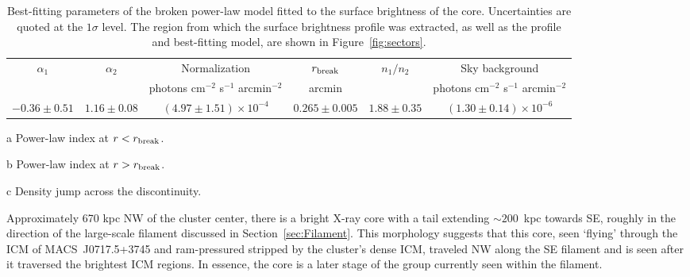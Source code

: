 \begin{table}
  \caption{Best-fitting parameters of the broken power-law model fitted to the surface brightness of the core. Uncertainties are quoted at the $1\sigma$ level. The region from which the surface brightness profile was extracted, as well as the profile and best-fitting model, are shown in Figure~\ref{fig:sectors}.\label{tab:bknpow}}
  \begin{center}
    \begin{threeparttable}
      \begin{tabular}{c c c c c c}
              $\alpha_1$\tnote{a} & $\alpha_2$\tnote{b} & Normalization & $r_{\rm break}$ & $n_1/n_2$\tnote{c} &  Sky background \\
                               &        &     photons cm$^{-2}$ s$^{-1}$ arcmin$^{-2}$       & arcmin   & &    photons cm$^{-2}$ s$^{-1}$ arcmin$^{-2}$ \\
              \hline
              $-0.36 \pm 0.51$ & $1.16 \pm 0.08$ & $(4.97 \pm 1.51)  \times 10^{-4}$ & $0.265\pm 0.005$ & $1.88\pm 0.35$ & $(1.30 \pm 0.14) \times 10^{-6} $ \\
      \end{tabular}
      \begin{tablenotes}
              \item[a] Power-law index at $r < r_{\rm break}$.
              \item[b] Power-law index at $r > r_{\rm break}$.
              \item[c] Density jump across the discontinuity.
      \end{tablenotes}
    \end{threeparttable}
  \end{center}
\end{table}

Approximately 670 kpc NW of the cluster center, there is a bright X-ray core with a tail extending $\sim 200$~kpc towards SE, roughly in the direction of the large-scale filament discussed in Section~\ref{sec:Filament}. This morphology suggests that this core, seen `flying' through the ICM of MACS~J0717.5+3745 and ram-pressured stripped by the cluster's dense ICM, traveled NW along the SE filament and is seen after it traversed the brightest ICM regions. In essence, the core is a later stage of the group currently seen within the filament. 

